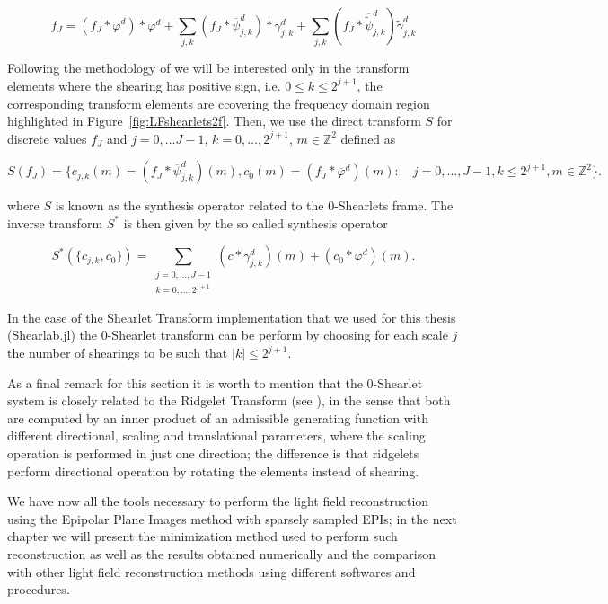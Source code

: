 $$
f_J=(f_J\ast \overline{\varphi}^d)\ast \varphi^d+\sum_{j,k}(f_J\ast\overline{\psi}^d_{j,k})\ast \gamma^d_{j,k}+\sum_{j,k}(f_J\ast \overline{\tilde{\psi}}^d_{j,k})\tilde{\gamma}^d_{j,k}
$$

Following the methodology of \cite{LF-Shearlets} we will be interested only in the transform elements where the shearing has positive sign, i.e. $0\leq k\leq 2^{j+1}$, the corresponding transform elements are ccovering the frequency domain region highlighted in Figure~\ref{fig:LFshearlets2f}. Then, we use the direct transform $S$ for discrete values $f_J$ and $j=0,\ldots J-1$, $k=0,\ldots, 2^{j+1}$, $m\in\mathbb{Z}^2$ defined as 

\begin{equation}
\label{eq:0analysis}
S(f_J)=\{ c_{j,k}(m)=(f_J\ast \overline{\psi}_{j,k}^d)(m),c_0(m)=(f_J\ast \overline{\varphi}^d)(m):\quad j=0,\ldots,J-1,k\leq 2^{j+1},m\in\mathbb{Z}^2\}.
\end{equation}

where $S$ is known as the synthesis operator related to the $0$-Shearlets frame. The inverse transform $S^*$ is then given by the so called synthesis operator 

\begin{equation}
\label{eq:0synthesis}
S^*(\{c_{j,k},c_0\})=\sum_{\begin{matrix}j=0,\ldots,J-1\\k=0,\ldots,2^{j+1}\end{matrix}}(c\ast \gamma_{j,k}^d)(m)+(c_0\ast\varphi^d)(m).
\end{equation}

In the case of the Shearlet Transform implementation that we used for this thesis (Shearlab.jl) the $0$-Shearlet transform can be perform by choosing for each scale $j$ the number of shearings to be such that $|k|\leq 2^{j+1}$.

\bigskip

As a final remark for this section it is worth to mention that the $0$-Shearlet system is closely related to the Ridgelet Transform (see \cite{ridgelet}), in the sense that both are computed by an inner product of an admissible generating function with different directional, scaling and translational parameters, where the scaling operation is performed in just one direction; the difference is that ridgelets perform directional operation by rotating the elements instead of shearing.

\bigskip

We have now all the tools necessary to perform the light field reconstruction using the Epipolar Plane Images method with sparsely sampled EPIs; in the next chapter we will present the minimization method used to perform such reconstruction as well as the results obtained numerically and the comparison with other light field reconstruction methods using different softwares and procedures. 
